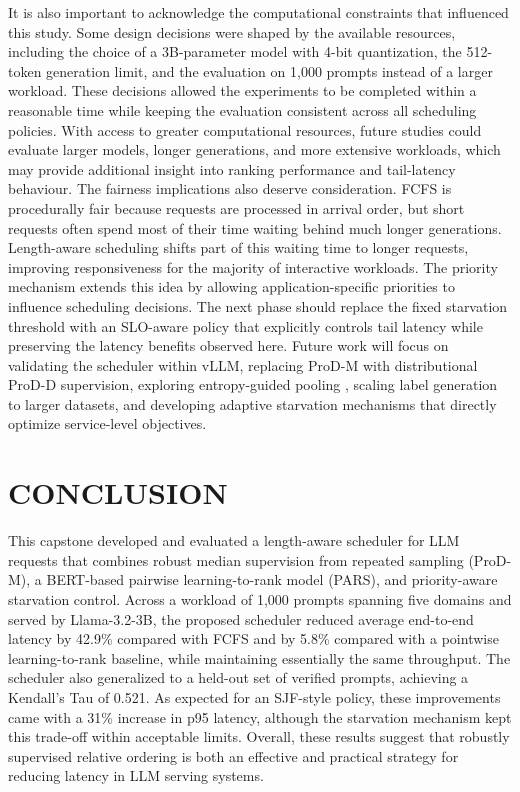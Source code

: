 \documentclass[conference]{IEEEtran}
\begin{document}
It is also important to acknowledge the computational constraints that influenced this study. Some design decisions were shaped by the available resources, including the choice of a 3B-parameter model with 4-bit quantization, the 512-token generation limit, and the evaluation on 1{,}000 prompts instead of a larger workload. These decisions allowed the experiments to be completed within a reasonable time while keeping the evaluation consistent across all scheduling policies. With access to greater computational resources, future studies could evaluate larger models, longer generations, and more extensive workloads, which may provide additional insight into ranking performance and tail-latency behaviour.
The fairness implications also deserve consideration. FCFS is procedurally fair because requests are processed in arrival order, but short requests often spend most of their time waiting behind much longer generations. Length-aware scheduling shifts part of this waiting time to longer requests, improving responsiveness for the majority of interactive workloads. The priority mechanism extends this idea by allowing application-specific priorities to influence scheduling decisions. The next phase should replace the fixed starvation threshold with an SLO-aware policy that explicitly controls tail latency while preserving the latency benefits observed here.
Future work will focus on validating the scheduler within vLLM, replacing ProD-M with distributional ProD-D supervision, exploring entropy-guided pooling \cite{xie2026egtp}, scaling label generation to larger datasets, and developing adaptive starvation mechanisms that directly optimize service-level objectives.

\clearpage
\section{CONCLUSION}
This capstone developed and evaluated a length-aware scheduler for LLM requests that combines robust median supervision from repeated sampling (ProD-M), a BERT-based pairwise learning-to-rank model (PARS), and priority-aware starvation control. Across a workload of 1,000 prompts spanning five domains and served by Llama-3.2-3B, the proposed scheduler reduced average end-to-end latency by 42.9\% compared with FCFS and by 5.8\% compared with a pointwise learning-to-rank baseline, while maintaining essentially the same throughput. The scheduler also generalized to a held-out set of verified prompts, achieving a Kendall's Tau of 0.521. As expected for an SJF-style policy, these improvements came with a 31\% increase in p95 latency, although the starvation mechanism kept this trade-off within acceptable limits. Overall, these results suggest that robustly supervised relative ordering is both an effective and practical strategy for reducing latency in LLM serving systems.
\end{document}
